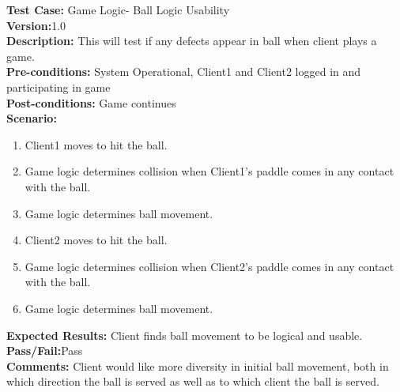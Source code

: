 \noindent \textbf{Test Case:} Game Logic- Ball Logic Usability\\
\textbf{Version:}1.0\\
\textbf{Description:} This will test if any defects appear in ball when client plays a game.\\
\textbf{Pre-conditions:} System Operational, Client1 and Client2 logged in and participating in game \\
\textbf{Post-conditions:} Game continues\\
\textbf{Scenario:}
\begin{enumerate}
\item Client1 moves to hit the ball.\\
\item Game logic determines collision when Client1's paddle comes in any contact with the ball. \\
\item Game logic determines ball movement.\\
\item Client2 moves to hit the ball.\\
\item Game logic determines collision when Client2's paddle comes in any contact with the ball. \\
\item Game logic determines ball movement.\\
\end{enumerate}
\textbf{Expected Results:} Client finds ball movement to be logical and usable.\\
\textbf{Pass/Fail:}Pass\\
\textbf{Comments:} Client would like more diversity in initial ball movement, both in which direction the ball is served as well as to which client the ball is served.\\

